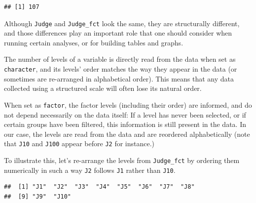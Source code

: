\documentclass[
]{krantz}
\makeatletter
\newenvironment{Shaded}{\begin{snugshade}}{\end{snugshade}}
\newcommand{\AttributeTok}[1]{\textcolor[rgb]{0.61,0.61,0.61}{#1}}
\newcommand{\ConstantTok}[1]{\textcolor[rgb]{0,0,0}{#1}}
\newcommand{\DecValTok}[1]{\textcolor[rgb]{0.06,0.06,0.06}{#1}}
\newcommand{\FunctionTok}[1]{\textcolor[rgb]{0,0,0}{#1}}
\newcommand{\NormalTok}[1]{#1}
\newcommand{\OtherTok}[1]{\textcolor[rgb]{0.37,0.37,0.37}{#1}}
\newcommand{\SpecialCharTok}[1]{\textcolor[rgb]{0,0,0}{#1}}
\renewenvironment{quote}{\begin{VF}}{\end{VF}}
\newenvironment{kframe}{%
\medskip{}
\setlength{\fboxsep}{.8em}
 \def\at@end@of@kframe{}%
 \ifinner\ifhmode%
  \def\at@end@of@kframe{\end{minipage}}%
  \begin{minipage}{\columnwidth}%
 \fi\fi%
 \def\FrameCommand##1{\hskip\@totalleftmargin \hskip-\fboxsep
 \colorbox{shadecolor}{##1}\hskip-\fboxsep
     \hskip-\linewidth \hskip-\@totalleftmargin \hskip\columnwidth}%
 \MakeFramed {\advance\hsize-\width
   \@totalleftmargin\z@ \linewidth\hsize
   \@setminipage}}%
 {\par\unskip\endMakeFramed%
 \at@end@of@kframe}
\renewenvironment{Shaded}{\begin{kframe}}{\end{kframe}}
\makeatother
\begin{document}
\begin{verbatim}
## [1] 107
\end{verbatim}

\begin{quote}
Although \texttt{Judge} and \texttt{Judge\_fct} look the same, they are structurally different, and those differences play an important role that one should consider when running certain analyses, or for building tables and graphs.
\end{quote}

The number of levels of a variable is directly read from the data when set as \texttt{character}, and its levels' order matches the way they appear in the data (or sometimes are re-arranged in alphabetical order). This means that any data collected using a structured scale will often lose its natural order.

When set as \texttt{factor}, the factor levels (including their order) are informed, and do not depend necessarily on the data itself: If a level has never been selected, or if certain groups have been filtered, this information is still present in the data. In our case, the levels are read from the data and are reordered alphabetically (note that \texttt{J10} and \texttt{J100} appear before \texttt{J2} for instance.)

To illustrate this, let's re-arrange the levels from \texttt{Judge\_fct} by ordering them numerically in such a way \texttt{J2} follows \texttt{J1} rather than \texttt{J10}.

\begin{Shaded}
\end{Shaded}

\begin{verbatim}
##  [1] "J1"  "J2"  "J3"  "J4"  "J5"  "J6"  "J7"  "J8" 
##  [9] "J9"  "J10"
\end{verbatim}
\end{document}
